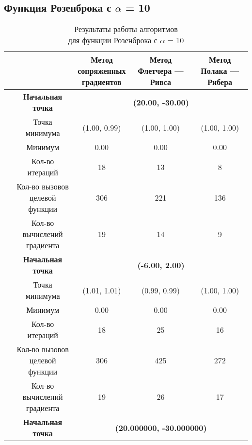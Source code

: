             \subsection{Функция Розенброка с $\alpha$ = 10}

\begin{table}[H]
        \centering
        \vspace*{-1.5em}
        \caption{Результаты работы алгоритмов\\для функции Розенброка с $\alpha$ = 10}
        \footnotesize
        \begin{tabular}{|c|c|c|c|c|}
        \hline
        & &\makecell{Метод\\сопряженных\\градиентов} &\makecell{Метод\\Флетчера --- Ривса} &\makecell{Метод\\Полака --- Рибера} \\
        \hline
	\multirow{10}{*}{\rotatebox[origin=c]{90}{$\varepsilon = 0.01$}}&\textbf{Начальная точка} &\multicolumn{3}{c|}{\textbf{(20.00, -30.00)}}\\
	\cline{2-5}
	&Точка минимума &(1.00, 0.99) &(1.00, 1.00) &(1.00, 1.00) \\ 
	\cline{2-5}
	&Минимум &0.00 &0.00 &0.00 \\ 
	\cline{2-5}
	&Кол-во итераций &18 &13 &8 \\ 
	\cline{2-5}
	&\makecell{Кол-во вызовов\\целевой функции} &306 &221 &136 \\ 
	\cline{2-5}
	&\makecell{Кол-во вычислений\\градиента} &19 &14 &9 \\ 
	\cline{2-5}
\cline{2-5}&\textbf{Начальная точка} &\multicolumn{3}{c|}{\textbf{(-6.00, 2.00)}}\\
	\cline{2-5}
	&Точка минимума &(1.01, 1.01) &(0.99, 0.99) &(1.00, 1.00) \\ 
	\cline{2-5}
	&Минимум &0.00 &0.00 &0.00 \\ 
	\cline{2-5}
	&Кол-во итераций &18 &25 &16 \\ 
	\cline{2-5}
	&\makecell{Кол-во вызовов\\целевой функции} &306 &425 &272 \\ 
	\cline{2-5}
	&\makecell{Кол-во вычислений\\градиента} &19 &26 &17 \\ 
	\cline{2-5}
	\hline
	\multirow{10}{*}{\rotatebox[origin=c]{90}{$\varepsilon = 1e-06$}}&\textbf{Начальная точка} &\multicolumn{3}{c|}{\textbf{(20.000000, -30.000000)}}\\

\end{tabular}
\end{table}
